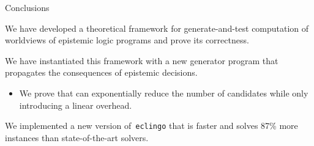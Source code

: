 \documentclass[aspectratio=169,svgnames,xcolor=table,t]{beamer}
\begin{document}
\begin{frame}{Conclusions}
    \begin{myitemize}
        \item We have developed a theoretical framework for generate-and-test computation of worldviews of epistemic logic programs and prove its correctness.
        
        \item We have instantiated this framework with a new generator program that propagates the consequences of epistemic decisions.
        \begin{itemize}
            \item We prove that can exponentially reduce the number of candidates while only introducing a linear overhead. 
        \end{itemize}

        \item We implemented a new version of~\texttt{eclingo} that is  faster and solves 87\% more instances than state-of-the-art solvers.
    \end{myitemize}
\end{frame}
\frame{\backcoverpage}
\end{document}
